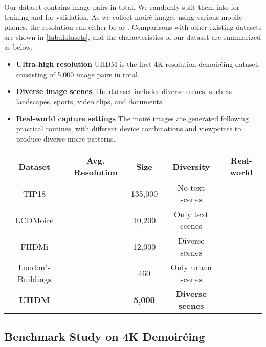 \documentclass[runningheads]{llncs}
\begin{document}
Our dataset contains  image pairs in total. We randomly split them into  for training and  for validation. As we collect moiré images using various mobile phones, the resolution can either be  or . 
Comparisons with other existing datasets are shown in \cref{tab:datasets}, and the characteristics of our dataset are summarized as below.

\begin{itemize}
\item \textbf{Ultra-high resolution} 
UHDM is the first 4K resolution demoiréing dataset, consisting of 5,000 image pairs in total. 
\item \textbf{Diverse image scenes}
The dataset includes diverse scenes, such as landscapes, sports, video clips, and documents.
\item \textbf{Real-world capture settings} The moiré images are generated following practical routines, with different device combinations and viewpoints to produce diverse moiré patterns.
\end{itemize}

 
 
\begin{table*}[t]
   \centering
   \caption{Comparisons of different demoiréing datasets; our dataset is the first ultra-high-definition dataset (``London's Buildings'' is not available currently)}
   \renewcommand\tabcolsep{5.0pt}
   \resizebox{10cm}{!}
   {
   \begin{tabular}{c|cccc}
   \toprule[1.2pt]
   Dataset &Avg. Resolution &Size &Diversity &Real-world \\
   \hline 
   TIP18 \cite{sun2018moire} & &135,000 &No text scenes &\\
   
   LCDMoiré \cite{yuan2019aim} & &10,200 &Only text scenes &\\
   
   FHDMi \cite{he2020fhde} & &12,000 &Diverse scenes &\\
   
   London's Buildings \cite{liu2020wavelet} & &460 &Only urban scenes &\\
   \midrule[0.8pt]
   \textbf{UHDM} & &\textbf{5,000} &\textbf{Diverse scenes} &\\
   \bottomrule[1.2pt]
   \end{tabular}
    }
\label{tab:datasets}
\end{table*}

\subsection{Benchmark Study on 4K Demoiréing}
\label{sec:challenge}
\end{document}
